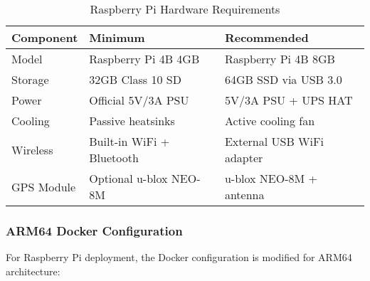 \documentclass[12pt,a4paper]{report}
\begin{document}
\begin{table}[H]
\centering
\begin{tabular}{|l|l|l|}
\hline
\textbf{Component} & \textbf{Minimum} & \textbf{Recommended} \\
\hline
Model & Raspberry Pi 4B 4GB & Raspberry Pi 4B 8GB \\
\hline
Storage & 32GB Class 10 SD & 64GB SSD via USB 3.0 \\
\hline
Power & Official 5V/3A PSU & 5V/3A PSU + UPS HAT \\
\hline
Cooling & Passive heatsinks & Active cooling fan \\
\hline
Wireless & Built-in WiFi + Bluetooth & External USB WiFi adapter \\
\hline
GPS Module & Optional u-blox NEO-8M & u-blox NEO-8M + antenna \\
\hline
\end{tabular}
\caption{Raspberry Pi Hardware Requirements}
\end{table}

\subsubsection{ARM64 Docker Configuration}

For Raspberry Pi deployment, the Docker configuration is modified for ARM64 architecture:
\end{document}
